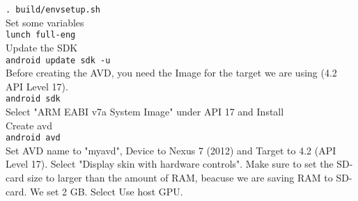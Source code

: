   \texttt{\justify . build/envsetup.sh} \\
  Set some variables\\
  \texttt{\justify lunch full-eng} \\
  Update the SDK\\
  \texttt{\justify android update sdk -u} \\
  Before creating the AVD, you need the Image for the target we are using (4.2 API Level 17).\\
  \texttt{\justify android sdk} \\
  Select "ARM EABI v7a System Image" under API 17 and Install\\
  Create avd\\
  \texttt{\justify android avd} \\
  Set AVD name to "myavd", Device to Nexus 7 (2012) and Target to 4.2 (API Level 17). Select "Display skin with hardware controls". 
  Make sure to set the SD-card size to larger than the amount of RAM, beacuse we are saving RAM to SD-card. 
  We set 2 GB. Select Use host GPU.\\
  
